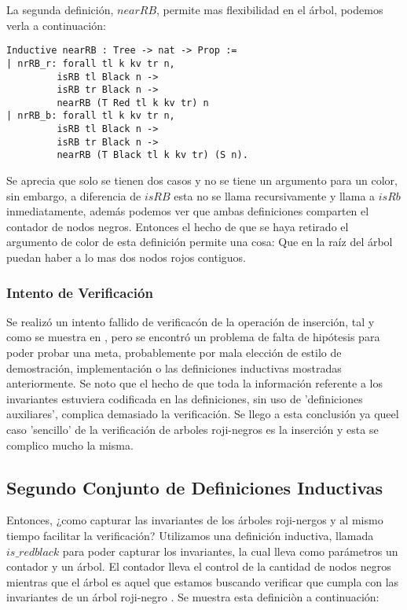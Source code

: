 \documentclass[letterpaper,12pt,oneside]{book}
\newcommand{\arn}{árbol roji-negro }
\newcommand{\arns}{arboles roji-negros }
\theoremstyle{plain}
\theoremstyle{definition}
\theoremstyle{remark}
\begin{document}
La segunda definici\'on, $nearRB$,  permite mas flexibilidad en el \'arbol, podemos verla a continuaci\'on: 
\begin{verbatim}
Inductive nearRB : Tree -> nat -> Prop :=
| nrRB_r: forall tl k kv tr n,
         isRB tl Black n ->
         isRB tr Black n ->
         nearRB (T Red tl k kv tr) n
| nrRB_b: forall tl k kv tr n,
         isRB tl Black n ->
         isRB tr Black n ->
         nearRB (T Black tl k kv tr) (S n).
\end{verbatim}
Se aprecia que solo se tienen dos casos y no se tiene un argumento para un color, sin embargo, a diferencia de $isRB$ esta no se
llama recursivamente y llama a $isRb$ inmediatamente, además podemos ver que ambas definiciones comparten el contador de nodos negros.
Entonces el hecho de que se haya retirado el argumento de color de esta definici\'on permite una cosa: Que en la ra\'iz del \'arbol 
puedan haber a lo mas dos nodos rojos contiguos.

\subsubsection{Intento de Verificaci\'on}
Se realiz\'o un intento fallido de verificac\'on de la operaci\'on de inserci\'on, tal y como se muestra en \cite{appel}, pero se encontró un
problema de falta de hipótesis para poder probar una meta, probablemente por mala elección de estilo de demostraci\'on, implementaci\'on o las definiciones 
inductivas mostradas anteriormente. Se noto que el hecho de que toda la informaci\'on referente a los invariantes estuviera codificada en las definiciones,
sin uso de 'definiciones auxiliares', complica demasiado la verificaci\'on. Se llego a esta conclusi\'on ya queel caso 'sencillo' de la verificaci\'on de
\arns es la inserci\'on y esta se complico mucho la misma.

\subsection{Segundo Conjunto de Definiciones Inductivas}

Entonces, ¿como capturar las invariantes de los \'arboles roji-nergos y al mismo tiempo facilitar la verificaci\'on? 
Utilizamos una definición inductiva, llamada $is\_redblack$
para poder capturar los invariantes, la cual lleva como parámetros un contador y un \'arbol. El contador
lleva el control de la cantidad de nodos negros mientras que el \'arbol es aquel que estamos buscando
verificar que cumpla con las invariantes de un \arn. Se muestra esta definici\`on a continuaci\'on:
\end{document}
